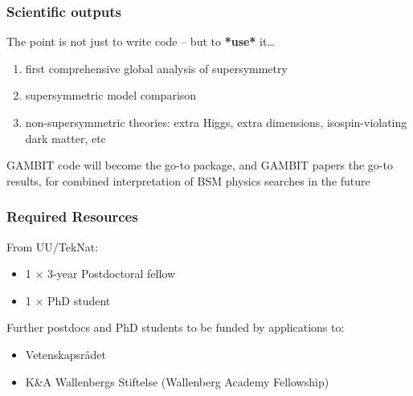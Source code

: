 \documentclass[xcolor=dvipsnames]{beamer}
\begin{document}
\begin{frame}
\frametitle{Scientific outputs}

The point is not just to write code -- but to \textbf{*use*} it\ldots
\begin{enumerate}
\item first comprehensive global analysis of supersymmetry 
\item supersymmetric model comparison
\item non-supersymmetric theories: extra Higgs, extra dimensions, isospin-violating dark matter, etc
\end{enumerate}
\vspace{5mm}
GAMBIT code will become the go-to package, and GAMBIT papers the go-to results, for combined interpretation of BSM physics searches in the future

\end{frame}


\begin{frame} 
\frametitle{Required Resources}

From UU/TekNat:
\begin{itemize}
  \item 1 $\times$ 3-year Postdoctoral fellow
  \item 1 $\times$ PhD student
\end{itemize}

\vspace{5mm}
Further postdocs and PhD students to be funded by applications to:
\begin{itemize}
  \item Vetenskapsr{\aa}det
  \item K\&A Wallenbergs Stiftelse (Wallenberg Academy Fellowship)
\end{itemize}
\end{frame}
\end{document}
